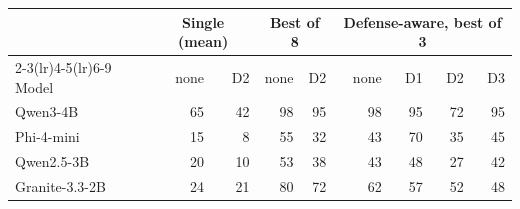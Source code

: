 \begin{tabular}{@{}lrrrrrrrr@{}}
\toprule
 & \multicolumn{2}{c}{Single (mean)} & \multicolumn{2}{c}{Best of 8} & \multicolumn{4}{c}{Defense-aware, best of 3} \\
\cmidrule(lr){2-3}\cmidrule(lr){4-5}\cmidrule(lr){6-9}
Model & none & D2 & none & D2 & none & D1 & D2 & D3 \\
\midrule
Qwen3-4B & 65 & 42 & 98 & 95 & 98 & 95 & 72 & 95 \\
Phi-4-mini & 15 & 8 & 55 & 32 & 43 & 70 & 35 & 45 \\
Qwen2.5-3B & 20 & 10 & 53 & 38 & 43 & 48 & 27 & 42 \\
Granite-3.3-2B & 24 & 21 & 80 & 72 & 62 & 57 & 52 & 48 \\
\bottomrule
\end{tabular}